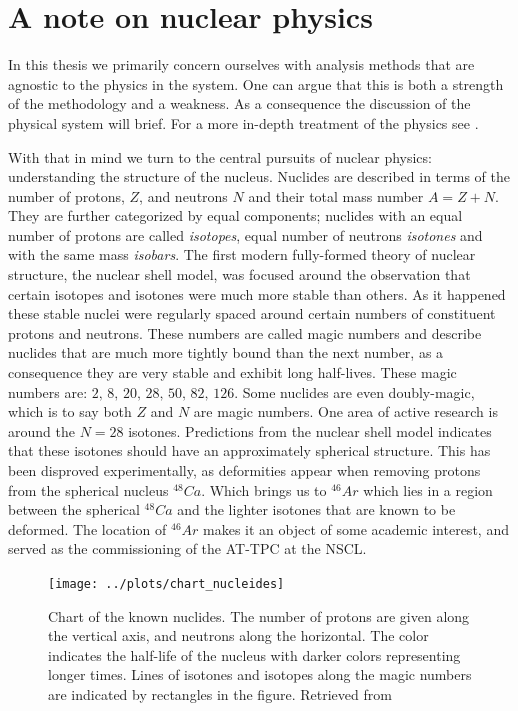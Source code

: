 

\section{A note on nuclear physics}

In this thesis we primarily concern ourselves with analysis methods that are agnostic to the physics in the system. One can argue that this is both a strength of the methodology and a weakness. As a consequence the discussion of the physical system will brief. For a more in-depth treatment of the physics  see \cite{Bradt2017}. 

With that in mind we turn to the central pursuits of nuclear physics: understanding the structure of the nucleus. Nuclides are described in terms of the number of protons, $Z$, and neutrons $N$ and their total mass number $A = Z +N$. They are further categorized by equal components; nuclides with an equal number of protons are called \textit{isotopes}, equal number of neutrons \textit{isotones} and with the same  mass \textit{isobars}. The first modern fully-formed theory of nuclear structure, the nuclear shell model, was focused around the observation that certain isotopes and isotones were much more stable than others. As it happened these stable nuclei were regularly spaced around certain numbers of constituent protons and neutrons. These numbers are called magic numbers and describe nuclides that are much more tightly bound than the next number, as a consequence they are very stable and exhibit long half-lives. These magic numbers are: $2 ,\, 8 ,\, 20 ,\, 28 ,\, 50 ,\, 82 ,\, 126$. Some nuclides are even doubly-magic, which is to say both $Z$ and $N$ are magic numbers. One area of active research is around the $N=28$ isotones. Predictions from the nuclear shell model indicates that these isotones should have an approximately spherical structure. This has been disproved experimentally, as deformities appear when removing protons from the spherical nucleus ${}^{48}Ca$. Which brings us to ${}^{46}Ar$ which lies in a region between the spherical ${}^{48}Ca$ and the lighter isotones that are known to be deformed. The location of ${}^{46}Ar$ makes it an object of some academic interest, and served as the commissioning of the AT-TPC at the NSCL. 


\begin{figure}
\centering
\texttt{[image: ../plots/chart\_nucleides]}
\caption[Chart of the nuclides]{Chart of the known nuclides. The number of protons are given along the vertical axis, and neutrons along the horizontal. The color indicates the half-life of the nucleus with darker colors representing longer times. Lines of isotones and isotopes along the magic numbers are indicated by rectangles in the figure. Retrieved from \cite{Sonzogni2019}}
\end{figure}


